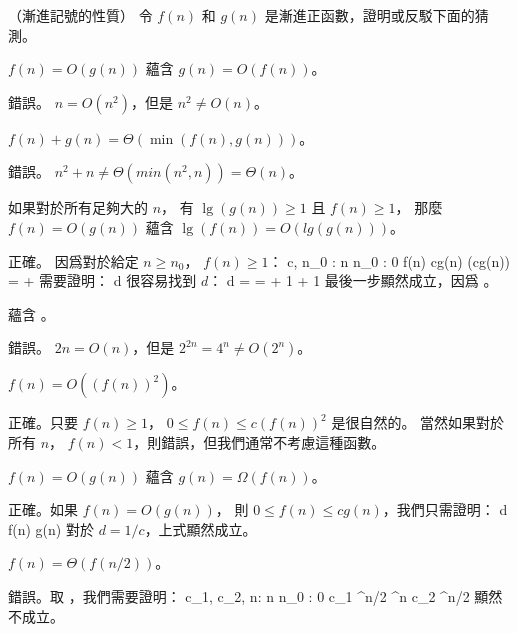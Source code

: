 \startPROBLEM
（漸進記號的性質）
令 $f(n)$ 和 $g(n)$ 是漸進正函數，證明或反駁下面的猜測。
\startigBase[a]
\item $f(n) = O(g(n))$ 蘊含 $g(n) = O(f(n))$。

\startANSWER
錯誤。 $n = O(n^2)$，但是 $n^2 \ne O(n)$。
\stopANSWER

\item $f(n) + g(n) = \Theta(\min(f(n), g(n)))$。

\startANSWER
錯誤。 $n^2 + n \ne \Theta(min(n^2, n)) = \Theta(n)$。
\stopANSWER

\item 如果對於所有足夠大的 $n$，
有 $\lg(g(n))\ge 1$ 且 $f(n)\ge 1$，
那麼 $f(n) = O(g(n))$ 蘊含 $\lg(f(n)) = O(lg(g(n)))$。

\startANSWER
正確。 因爲對於給定 $n \ge n_0$， $f(n) \ge 1$：
\startformula
\exists c, n_0 : \forall n \ge n_0 : 0 \le f(n) \le cg(n)
\stopformula
\startformula
   \Downarrow
\stopformula
{} \le {} \le \lg(cg(n)) =  + 
\stopformula
需要證明：
\startformula
{} \le d
\stopformula
很容易找到 $d$：
\startsplitformula\startmathalignment
\NC d \NC =  \NR
\NC \NC =  + 1 \NR
\NC \NC \le {} + 1 \NR
\stopmathalignment\stopsplitformula
最後一步顯然成立，因爲 。
\stopANSWER

\item {} 蘊含 。

\startANSWER
錯誤。 $2n = O(n)$，但是 $2^{2n} = 4^n \ne O(2^n)$。
\stopANSWER

\item $f(n) = O((f(n))^2)$。

\startANSWER
正確。只要 $f(n) \ge 1$， $0 \le f(n) \le c(f(n))^2$ 是很自然的。
當然如果對於所有 $n$， $f(n) < 1$，則錯誤，但我們通常不考慮這種函數。
\stopANSWER

\item $f(n) = O(g(n))$ 蘊含 $g(n) = \Omega(f(n))$。

\startANSWER
正確。如果 $f(n) = O(g(n))$，
則 $0 \le f(n) \le cg(n)$，我們只需證明：
 \le d f(n) \le g(n)
\stopformula
對於 $d = 1/c$，上式顯然成立。
\stopANSWER

\item $f(n) = \Theta(f(n/2))$。

\startANSWER
錯誤。取 ，我們需要證明：
\startformula
\exists c_1, c_2, n: \forall n \geq n_0 : 0 \leq c_1 ^{n/2} ^n
   \leq c_2 ^{n/2}
\stopformula
顯然不成立。
\stopANSWER

